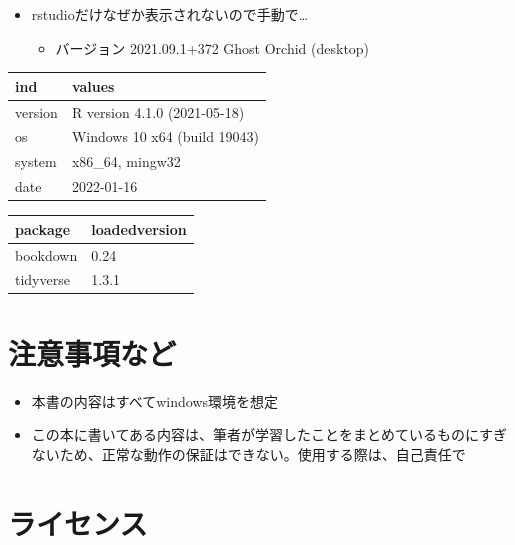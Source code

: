 \documentclass[
  xelatex,ja=standard, b5paper]{bxjsbook}
\providecommand{\tightlist}{%
  \setlength{\itemsep}{0pt}\setlength{\parskip}{0pt}}
\begin{document}
\begin{itemize}
\tightlist
\item
  rstudioだけなぜか表示されないので手動で\ldots{}

  \begin{itemize}
  \tightlist
  \item
    バージョン 2021.09.1+372 Ghost Orchid (desktop)
  \end{itemize}
\end{itemize}

\begin{tabular}{l|l}
\hline
ind & values\\
\hline
version & R version 4.1.0 (2021-05-18)\\
\hline
os & Windows 10 x64 (build 19043)\\
\hline
system & x86\_64, mingw32\\
\hline
date & 2022-01-16\\
\hline
\end{tabular}

\begin{tabular}{l|l}
\hline
package & loadedversion\\
\hline
bookdown & 0.24\\
\hline
tidyverse & 1.3.1\\
\hline
\end{tabular}

\hypertarget{ux6ce8ux610fux4e8bux9805ux306aux3069}{%
\section*{注意事項など}\label{ux6ce8ux610fux4e8bux9805ux306aux3069}}

\begin{itemize}
\tightlist
\item
  本書の内容はすべてwindows環境を想定
\item
  この本に書いてある内容は、筆者が学習したことをまとめているものにすぎないため、正常な動作の保証はできない。使用する際は、自己責任で
\end{itemize}

\hypertarget{ux30e9ux30a4ux30bbux30f3ux30b9}{%
\section*{ライセンス}\label{ux30e9ux30a4ux30bbux30f3ux30b9}}
\end{document}
